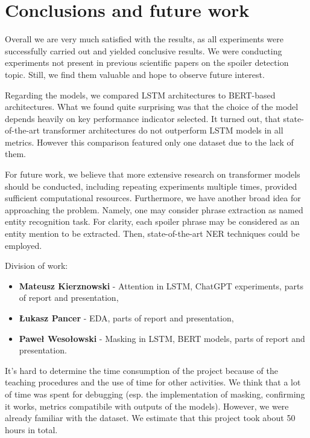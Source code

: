 \documentclass[11pt]{article}
\begin{document}
\section{Conclusions and future work} \label{conclusions}


Overall we are very much satisfied with the results, as all experiments were successfully carried out and yielded conclusive results. We were conducting experiments not present in previous scientific papers on the spoiler detection topic. Still, we find them valuable and hope to observe future interest.

Regarding the models, we compared LSTM architectures to BERT-based architectures. What we found quite surprising was that the choice of the model depends heavily on key performance indicator selected. It turned out, that state-of-the-art transformer architectures do not outperform LSTM models in all metrics. However this comparison featured only one dataset due to the lack of them.

For future work, we believe that more extensive research on transformer models should be conducted, including repeating experiments multiple times, provided sufficient computational resources. Furthermore, we have another broad idea for approaching the problem. Namely, one may consider phrase extraction as named entity recognition task. For clarity, each spoiler phrase may be considered as an entity mention to be extracted. Then, state-of-the-art NER techniques could be employed.


Division of work:
\begin{itemize}
    \item \textbf{Mateusz Kierznowski} - Attention in LSTM, ChatGPT experiments, parts of report and presentation,
    \item \textbf{Łukasz Pancer} - EDA, parts of report and presentation,
    \item \textbf{Paweł Wesołowski} - Masking in LSTM, BERT models, parts of report and presentation.
\end{itemize}
It's hard to determine the time consumption of the project because of the teaching procedures and the use of time for other activities. We think that a lot of time was spent for debugging (esp. the implementation of masking, confirming it works, metrics compatibile with outputs of the models). However, we were already familiar with the dataset. We estimate that this project took about 50 hours in total.




\end{document}
